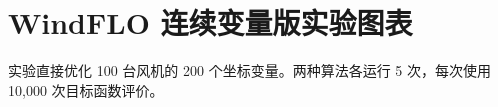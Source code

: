 \documentclass[UTF8,a4paper,11pt]{ctexart}
\begin{document}
\section*{WindFLO 连续变量版实验图表}
实验直接优化 100 台风机的 200 个坐标变量。两种算法各运行 5 次，每次使用 10,000 次目标函数评价。

\end{document}
